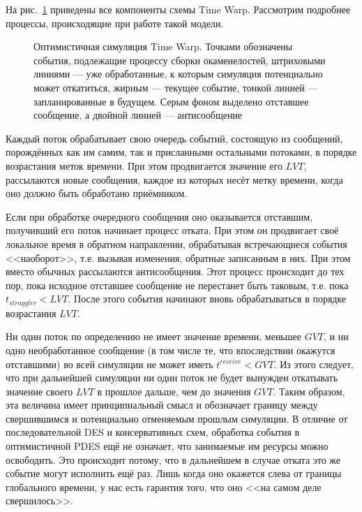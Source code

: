 На рис.~\ref{fig:time-warp} приведены все компоненты схемы Time Warp. Рассмотрим подробнее процессы, происходящие при работе такой модели.

\begin{figure}[htbp]
    \centering
    \caption[Симуляция Time Warp]{Оптимистичная симуляция Time Warp. Точками обозначены события, подлежащие процессу сборки окаменелостей, штриховыми линиями — уже обработанные, к которым симуляция потенциально может откатиться, жирным — текущее событие, тонкой линией — запланированные в будущем. Серым фоном выделено отставшее сообщение, а двойной линией — антисообщение}
    \label{fig:time-warp}
\end{figure}

\begin{itemize*}
\item Каждый поток обрабатывает свою очередь событий, состоящую из сообщений, порождённых как им самим, так и присланными остальными потоками, в порядке возрастания меток времени. При этом продвигается значение его $LVT$, рассылаются новые сообщения, каждое из которых несёт метку времени, когда оно должно быть обработано приёмником.

\item Если при обработке очередного сообщения оно оказывается отставшим, получивший его поток начинает процесс отката. При этом он продвигает своё локальное время в обратном направлении, обрабатывая встречающиеся события <<наоборот>>, т.е. вызывая изменения, обратные записанным в них. При этом вместо обычных рассылаются антисообщения. Этот процесс происходит до тех пор, пока исходное отставшее сообщение не перестанет быть таковым, т.е. пока $t_{straggler} < LVT$. После этого события начинают вновь обрабатываться в порядке возрастания $LVT$.

\item Ни один поток по определению не имеет значение времени, меньшее $GVT$, и ни одно необработанное сообщение (в том числе те, что впоследствии окажутся отставшими) во всей симуляции не может иметь $t^{receive} < GVT$. Из этого следует, что при дальнейшей симуляции ни один поток не будет вынужден откатывать значение своего $LVT$ в прошлое дальше, чем до значения $GVT$. Таким образом, эта величина имеет принципиальный смысл и обозначает границу между свершившимся и потенциально отменяемым прошлым симуляции. В отличие от последовательной DES и консервативных схем, обработка события в оптимистичной PDES ещё не означает, что занимаемые им ресурсы можно освободить. Это происходит потому, что в дальнейшем в случае отката это же событие могут исполнить ещё раз. Лишь когда оно окажется слева от границы глобального времени, у нас есть гарантия того, что оно <<на самом деле свершилось>>.

\end{itemize*}

